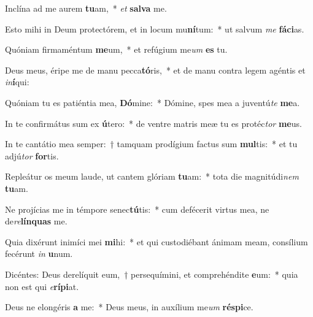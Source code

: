\item Inclína ad me aurem \textbf{tu}am,~* \textit{et} \textbf{sal}\textbf{va} me.
\item Esto mihi in Deum protectórem, et in locum mu\textbf{ní}tum:~* ut salvum \textit{me} \textbf{fá}\textbf{ci}as.
\item Quóniam firmaméntum \textbf{me}um,~* et refúgium me\textit{um} \textbf{es} tu.
\item Deus meus, éripe me de manu pecca\textbf{tó}ris,~* et de manu contra legem agéntis et \textit{in}\textbf{í}qui:
\item Quóniam tu es patiéntia mea, \textbf{Dó}mine:~* Dómine, spes mea a juventú\textit{te} \textbf{me}a.
\item In te confirmátus sum ex \textbf{ú}tero:~* de ventre matris meæ tu es protéc\textit{tor} \textbf{me}us.
\item In te cantátio mea semper:~† tamquam prodígium factus sum \textbf{mul}tis:~* et tu adjú\textit{tor} \textbf{for}tis.
\item Repleátur os meum laude, ut cantem glóriam \textbf{tu}am:~* tota die magnitúdi\textit{nem} \textbf{tu}am.
\item Ne projícias me in témpore senec\textbf{tú}tis:~* cum defécerit virtus mea, ne de\textit{re}\textbf{lín}\textbf{quas} me.
\item Quia dixérunt inimíci mei \textbf{mi}hi:~* et qui custodiébant ánimam meam, consílium fecérunt \textit{in} \textbf{u}num.
\item Dicéntes: Deus derelíquit eum,~† persequímini, et comprehéndite \textbf{e}um:~* quia non est qui \textit{e}\textbf{rí}\textbf{pi}at.
\item Deus ne elongéris \textbf{a} me:~* Deus meus, in auxílium me\textit{um} \textbf{ré}\textbf{spi}ce.
